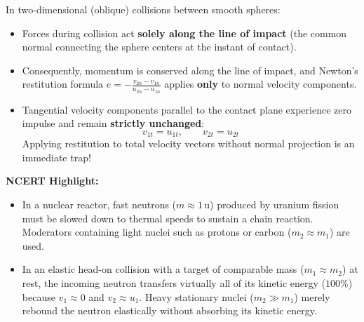 \documentclass[10pt,a4paper]{article}
\begin{document}
\begin{trapbox}
In two-dimensional (oblique) collisions between smooth spheres:
\begin{itemize}
  \item Forces during collision act \textbf{solely along the line of impact} (the common normal connecting the sphere centers at the instant of contact).
  \item Consequently, momentum is conserved along the line of impact, and Newton's restitution formula $e = -\frac{v_{2n} - v_{1n}}{u_{2n} - u_{1n}}$ applies \textbf{only} to normal velocity components.
  \item Tangential velocity components parallel to the contact plane experience zero impulse and remain \textbf{strictly unchanged}:
  \begin{equation}
    v_{1t} = u_{1t}, \qquad v_{2t} = u_{2t}
  \end{equation}
  Applying restitution to total velocity vectors without normal projection is an immediate trap!
\end{itemize}
\end{trapbox}

\begin{ncertbox}
\textbf{NCERT Highlight:}
\begin{itemize}
  \item In a nuclear reactor, fast neutrons ($m \approx 1\,\mathrm{u}$) produced by uranium fission must be slowed down to thermal speeds to sustain a chain reaction. Moderators containing light nuclei such as protons or carbon ($m_2 \approx m_1$) are used.
  \item In an elastic head-on collision with a target of comparable mass ($m_1 \approx m_2$) at rest, the incoming neutron transfers virtually all of its kinetic energy ($100\%$) because $v_1 \approx 0$ and $v_2 \approx u_1$. Heavy stationary nuclei ($m_2 \gg m_1$) merely rebound the neutron elastically without absorbing its kinetic energy.
\end{itemize}
\end{ncertbox}
\end{document}
